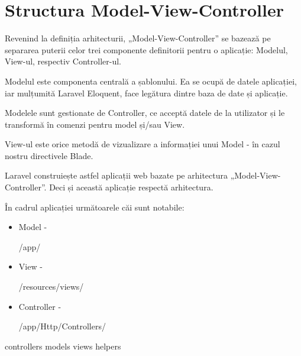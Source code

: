\section{Structura Model-View-Controller}

	Revenind la definiția arhitecturii, „Model-View-Controller” se bazează pe separarea puterii celor trei componente definitorii pentru o aplicație: Modelul, View-ul, respectiv Controller-ul.\cite{poo_sa}

	Modelul este componenta centrală a șablonului.
	Ea se ocupă de datele aplicației, iar mulțumită Laravel Eloquent, face legătura dintre baza de date și aplicație.

	Modelele sunt gestionate de Controller, ce acceptă datele de la utilizator și le transformă în comenzi pentru model și/sau View.

	View-ul este orice metodă de vizualizare a informației unui Model -  în cazul nostru directivele Blade.

	Laravel construiește astfel aplicații web bazate pe arhitectura „Model-View-Controller”.
	Deci și această aplicație respectă arhitectura.

	În cadrul aplicației următoarele căi sunt notabile:
	\begin{itemize}
		\item Model - \begin{verb} /app/ \end{verb}
		\item View - \begin{verb} /resources/views/ \end{verb}
		\item Controller - \begin{verb} /app/Http/Controllers/ \end{verb}
	\end{itemize}

	{controllers}
	{models}
	{views}
	{helpers}
